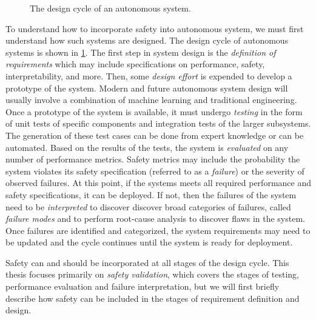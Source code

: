 \begin{figure}[!t]
\centering

\caption{The design cycle of an autonomous system.  }
\label{fig:design_cycle}
\end{figure}

To understand how to incorporate safety into autonomous system, we must first understand how such systems are designed. The design cycle of autonomous systems is shown in \cref{fig:design_cycle}. The first step in system design is the \emph{definition of requirements} which may include specifications on performance, safety, interpretability, and more. Then, some \emph{design effort} is expended to develop a prototype of the system. Modern and future autonomous system design will usually involve a combination of machine learning and traditional engineering. Once a prototype of the system is available, it must undergo \emph{testing} in the form of unit tests of specific components and integration tests of the larger subsystems. The generation of these test cases can be done from expert knowledge or can be automated. Based on the results of the tests, the system is \emph{evaluated} on any number of performance metrics. Safety metrics may include the probability the system violates its safety specification (referred to as a \emph{failure}) or the severity of observed failures. At this point, if the systems meets all required performance and safety specifications, it can be deployed. If not, then the failures of the system need to be \emph{interpreted} to discover discover broad categories of failures, called \emph{failure modes} and to perform root-cause analysis to discover flaws in the system. Once failures are identified and categorized, the system requirements may need to be updated and the cycle continues until the system is ready for deployment. 


Safety can and should be incorporated at all stages of the design cycle. This thesis focuses primarily on \emph{safety validation}, which covers the stages of testing, performance evaluation and failure interpretation, but we will first briefly describe how safety can be included in the stages of requirement definition and design. 

